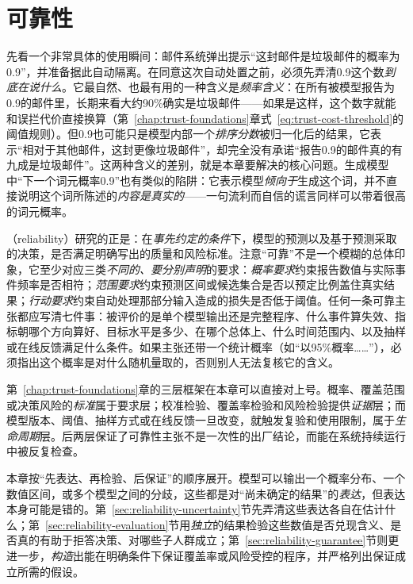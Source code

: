 \chapter{可靠性}
\label{chap:trust-reliability}

先看一个非常具体的使用瞬间：邮件系统弹出提示“这封邮件是垃圾邮件的概率为0.9”，并准备据此自动隔离。在同意这次自动处置之前，必须先弄清0.9这个数\emph{到底在说什么}。它最自然、也最有用的一种含义是\emph{频率含义}：在所有被模型报告为0.9的邮件里，长期来看大约90\%确实是垃圾邮件——如果是这样，这个数字就能和误拦代价直接换算（第~\ref{chap:trust-foundations}章式~\eqref{eq:trust-cost-threshold}的阈值规则）。但0.9也可能只是模型内部一个\emph{排序分数}被归一化后的结果，它表示“相对于其他邮件，这封更像垃圾邮件”，却完全没有承诺“报告0.9的邮件真的有九成是垃圾邮件”。这两种含义的差别，就是本章要解决的核心问题。生成模型中“下一个词元概率0.9”也有类似的陷阱：它表示模型\emph{倾向于}生成这个词，并不直接说明这个词所陈述的\emph{内容是真实的}——一句流利而自信的谎言同样可以带着很高的词元概率。

（reliability）研究的正是：在\emph{事先约定的条件}下，模型的预测以及基于预测采取的决策，是否满足明确写出的质量和风险标准。注意“可靠”不是一个模糊的总体印象，它至少对应三类\emph{不同的、要分别声明}的要求：\emph{概率要求}约束报告数值与实际事件频率是否相符；\emph{范围要求}约束预测区间或候选集合是否以预定比例盖住真实结果；\emph{行动要求}约束自动处理那部分输入造成的损失是否低于阈值。任何一条可靠主张都应写清七件事：被评价的是单个模型输出还是完整程序、什么事件算失效、指标朝哪个方向算好、目标水平是多少、在哪个总体上、什么时间范围内、以及抽样或在线反馈满足什么条件。如果主张还带一个统计概率（如“以95\%概率……”），必须指出这个概率是对什么随机量取的，否则别人无法复核它的含义。

第~\ref{chap:trust-foundations}章的三层框架在本章可以直接对上号。概率、覆盖范围或决策风险的\emph{标准}属于要求层；校准检验、覆盖率检验和风险检验提供\emph{证据}层；而模型版本、阈值、抽样方式或在线反馈一旦改变，就触发复验和使用限制，属于\emph{生命周期}层。后两层保证了可靠性主张不是一次性的出厂结论，而能在系统持续运行中被反复检查。

本章按“先表达、再检验、后保证”的顺序展开。模型可以输出一个概率分布、一个数值区间，或多个模型之间的分歧，这些都是对“尚未确定的结果”的\emph{表达}，但表达本身可能是错的。第~\ref{sec:reliability-uncertainty}节先弄清这些表达各自在估计什么；第~\ref{sec:reliability-evaluation}节用\emph{独立}的结果检验这些数值是否兑现含义、是否真的有助于拒答决策、对哪些子人群成立；第~\ref{sec:reliability-guarantee}节则更进一步，\emph{构造}出能在明确条件下保证覆盖率或风险受控的程序，并严格列出保证成立所需的假设。

